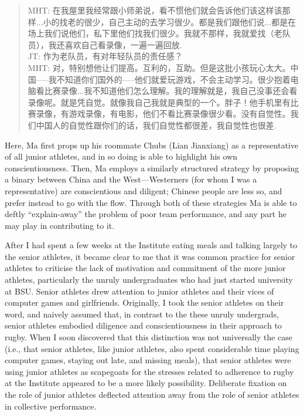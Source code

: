 \begin{CJK}{UTF8}{gbsn}
  \begin{quote}
    MHT: 在我屋里我经常跟小师弟说，看不惯他们就会告诉他们该这样该那样...小的找老的很少，自己主动的去学习很少。都是我们跟他们说...都是在场上我们说他们，私下里他们找我们很少。我就不那样，我就爱找（老队员），我还喜欢自己看录像，一遍一遍回放. \\
    JT: 作为老队员，有对年轻队员的责任感？
    \\
    MHT: 对，特别想他让们提高。互利的，互助。但是这批小孩玩心太大。中国—--我不知道你们国外的—--他们就爱玩游戏，不会主动学习。很少抱着电脑看比赛录像...我不知道他们怎么理解。我的理解就是，我自己没事还会看录像呢。就是凭自觉。就像我自己我就是典型的一个。胖子！他手机里有比赛录像，有游戏录像，有电影，他们不看比赛录像很少看。没有自觉性。我们中国人的自觉性跟你们的话，我们自觉性都很差，我自觉性也很差.
  \end{quote}

Here, Ma first props up his roommate Chubs (Lian Jianxiang) as a representative of all junior athletes, and in so doing is able to highlight his own conscientiousness.  Then, Ma employs a similarly structured strategy by proposing a binary between China and the West---Westerners (for whom I was a representative) are conscientious and diligent; Chinese people are less so, and prefer instead to go with the flow.  Through both of these strategies Ma is able to deftly ``explain-away'' the problem of poor team performance, and any part he may play in contributing to it.

After I had spent a few weeks at the Institute eating meals and talking largely to the senior athletes, it became clear to me that it was common practice for senior athletes to criticise the lack of motivation and commitment of the more junior athletes, particularly the unruly undergraduates who had just started university at BSU.  Senior athletes drew attention to junior athletes and their vices of computer games and girlfriends.  Originally, I took the senior athletes on their word, and naively assumed that, in contrast to the these unruly undergrads, senior athletes embodied diligence and conscientiousness in their approach to rugby.  When I soon discovered that this distinction was not universally the case (i.e., that senior athletes, like junior athletes, also spent considerable time playing computer games, staying out late, and missing meals), that senior athletes were using junior athletes as scapegoats for the stresses related to adherence to rugby at the Institute appeared to be a more likely possibility.  Deliberate fixation on the role of junior athletes deflected attention away from the role of senior athletes in collective performance.


\end{CJK}
